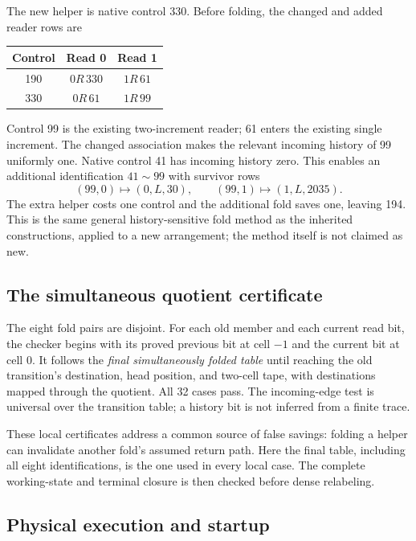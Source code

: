 \documentclass[10pt,letterpaper]{article}
\begin{document}
The new helper is native control 330. Before folding, the changed and
added reader rows are
\begin{center}
\begin{tabular}{@{}ccc@{}}
\toprule Control & Read 0 & Read 1\\\midrule
190 & $0R\,330$ & $1R\,61$\\
330 & $0R\,61$ & $1R\,99$\\
\bottomrule
\end{tabular}
\end{center}
Control 99 is the existing two-increment reader; 61 enters the existing
single increment. The changed association makes the relevant incoming
history of 99 uniformly one. Native control 41 has incoming history
zero. This enables an additional identification $41\sim99$ with
survivor rows
\[
             (99,0)\mapsto(0,L,30),\qquad
             (99,1)\mapsto(1,L,2035).
\]
The extra helper costs one control and the additional fold saves one,
leaving 194. This is the same general history-sensitive fold method as
the inherited constructions, applied to a new arrangement; the method
itself is not claimed as new.

\subsection{The simultaneous quotient certificate}

The eight fold pairs are disjoint. For each old member and each current
read bit, the checker begins with its proved previous bit at cell $-1$
and the current bit at cell 0. It follows the \emph{final simultaneously
folded table} until reaching the old transition's destination, head
position, and two-cell tape, with destinations mapped through the
quotient. All 32 cases pass. The incoming-edge test is universal over
the transition table; a history bit is not inferred from a finite trace.

These local certificates address a common source of false savings:
folding a helper can invalidate another fold's assumed return path.
Here the final table, including all eight identifications, is the one
used in every local case. The complete working-state and terminal
closure is then checked before dense relabeling.

\subsection{Physical execution and startup}
\end{document}
